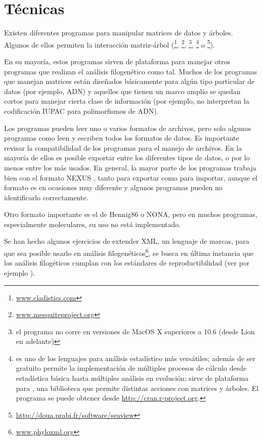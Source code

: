 \section*{T\'ecnicas}

Existen diferentes programas para manipular matrices de datos y \'arboles. Algunos de ellos permiten la interacci\'on matriz-\'arbol 
(\footnote{\url{www.cladistics.com}}, 
\footnote{\url{www.mesquiteproject.org}}, 
\footnote{el programa no corre en versiones de MacOS X superiores a 10.6 (desde Lion en adelante)}, 
\footnote{ es uno de los lenguajes para an\'alisis estad\'istico m\'as vers\'atiles; adem\'as de ser gratuito permite la implementaci\'on de m\'ultiples procesos de c\'alculo desde estad\'istica b\'asica hasta m\'ultiples an\'alisis en evoluci\'on; sirve de plataforma para  \cite{Paradis2008}, una biblioteca que permite distintas acciones con matrices y \'arboles. El programa se puede obtener desde \url{http://cran.r-project.org}.}
o 
\footnote{\url{http://doua.prabi.fr/software/seaview}}). 

En su mayor\'ia, estos programas sirven de plataforma para manejar otros programas que realizan el an\'alisis filogen\'etico como tal. Muchos de los programas que manejan matrices est\'an dise\~nados b\'asicamente para alg\'un tipo particular de datos (por ejemplo, ADN) y aquellos que tienen un marco amplio se quedan cortos para manejar cierta clase de informaci\'on (por ejemplo, no interpretan la codificaci\'on IUPAC para polimorfismos de ADN).

Los programas pueden leer uno o varios formatos de archivos, pero solo algunos programas como  leen y escriben todos los formatos de datos. Es importante revisar la compatibilidad de los programas para el manejo de archivos. En la mayor\'ia de ellos es posible exportar entre los diferentes tipos de datos, o por lo menos entre los m\'as usados. En general, la mayor parte de los programas trabaja bien con el formato NEXUS \citep{Maddison1997}, tanto para exportar como para importar, aunque el formato es en ocasiones muy diferente y algunos programas pueden no identificarlo correctamente. 

Otro formato importante es el de Hennig86 o NONA, pero en muchos programas, especialmente moleculares, su uso no est\'a implementado.

Se han hecho algunos ejercicios de extender XML, un lenguaje de marcas, para que sea posible usarlo en an\'alisis filogen\'eticos\footnote{\url{www.phyloxml.org}}, se busca en \'ultima instancia que los an\'alisis filog\'eticos cumplan con los est\'andares de reproductibilidad (ver por ejemplo \cite{Cranston2014}).

